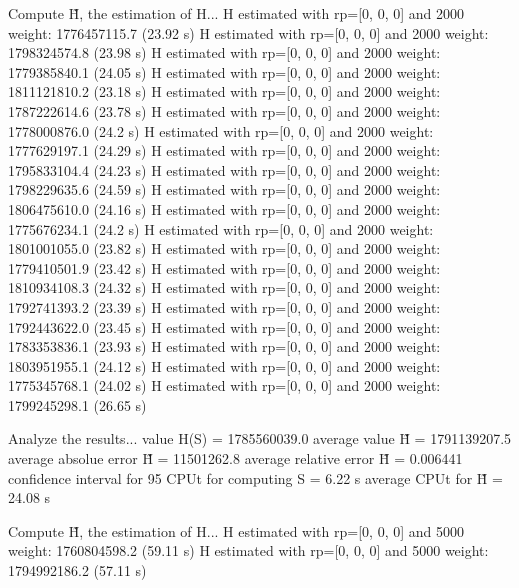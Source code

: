 Compute H̃, the estimation of H...
  H estimated with rp=[0, 0, 0] and 2000 weight:  1776457115.7  (23.92 s)
  H estimated with rp=[0, 0, 0] and 2000 weight:  1798324574.8  (23.98 s)
  H estimated with rp=[0, 0, 0] and 2000 weight:  1779385840.1  (24.05 s)
  H estimated with rp=[0, 0, 0] and 2000 weight:  1811121810.2  (23.18 s)
  H estimated with rp=[0, 0, 0] and 2000 weight:  1787222614.6  (23.78 s)
  H estimated with rp=[0, 0, 0] and 2000 weight:  1778000876.0  (24.2 s)
  H estimated with rp=[0, 0, 0] and 2000 weight:  1777629197.1  (24.29 s)
  H estimated with rp=[0, 0, 0] and 2000 weight:  1795833104.4  (24.23 s)
  H estimated with rp=[0, 0, 0] and 2000 weight:  1798229635.6  (24.59 s)
  H estimated with rp=[0, 0, 0] and 2000 weight:  1806475610.0  (24.16 s)
  H estimated with rp=[0, 0, 0] and 2000 weight:  1775676234.1  (24.2 s)
  H estimated with rp=[0, 0, 0] and 2000 weight:  1801001055.0  (23.82 s)
  H estimated with rp=[0, 0, 0] and 2000 weight:  1779410501.9  (23.42 s)
  H estimated with rp=[0, 0, 0] and 2000 weight:  1810934108.3  (24.32 s)
  H estimated with rp=[0, 0, 0] and 2000 weight:  1792741393.2  (23.39 s)
  H estimated with rp=[0, 0, 0] and 2000 weight:  1792443622.0  (23.45 s)
  H estimated with rp=[0, 0, 0] and 2000 weight:  1783353836.1  (23.93 s)
  H estimated with rp=[0, 0, 0] and 2000 weight:  1803951955.1  (24.12 s)
  H estimated with rp=[0, 0, 0] and 2000 weight:  1775345768.1  (24.02 s)
  H estimated with rp=[0, 0, 0] and 2000 weight:  1799245298.1  (26.65 s)

Analyze the results...
  value H(S)                  = 1785560039.0 
  average value H̃             = 1791139207.5 
  average absolue error H̃     = 11501262.8 
  average relative error H̃    = 0.006441 
  confidence interval for 95%
  CPUt for computing S         = 6.22 s
  average CPUt for H̃           = 24.08 s

Compute H̃, the estimation of H...
  H estimated with rp=[0, 0, 0] and 5000 weight:  1760804598.2  (59.11 s)
  H estimated with rp=[0, 0, 0] and 5000 weight:  1794992186.2  (57.11 s)